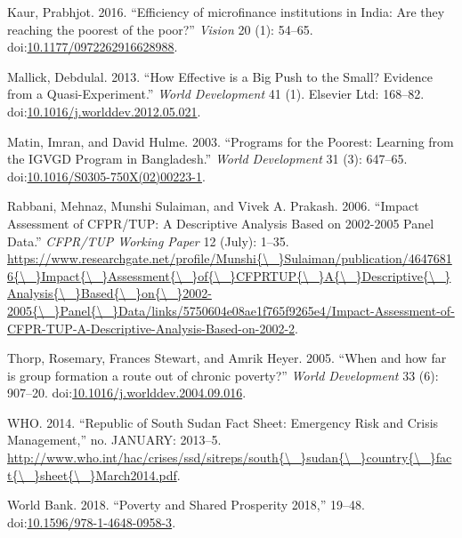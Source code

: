 \documentclass[]{article}
\begin{document}
\hypertarget{ref-Kaur2016}{}
Kaur, Prabhjot. 2016. ``Efficiency of microfinance institutions in
India: Are they reaching the poorest of the poor?'' \emph{Vision} 20
(1): 54--65.
doi:\href{https://doi.org/10.1177/0972262916628988}{10.1177/0972262916628988}.

\hypertarget{ref-Mallick2013}{}
Mallick, Debdulal. 2013. ``How Effective is a Big Push to the Small?
Evidence from a Quasi-Experiment.'' \emph{World Development} 41 (1).
Elsevier Ltd: 168--82.
doi:\href{https://doi.org/10.1016/j.worlddev.2012.05.021}{10.1016/j.worlddev.2012.05.021}.

\hypertarget{ref-Matin2003}{}
Matin, Imran, and David Hulme. 2003. ``Programs for the Poorest:
Learning from the IGVGD Program in Bangladesh.'' \emph{World
Development} 31 (3): 647--65.
doi:\href{https://doi.org/10.1016/S0305-750X(02)00223-1}{10.1016/S0305-750X(02)00223-1}.

\hypertarget{ref-Rabbani2006}{}
Rabbani, Mehnaz, Munshi Sulaiman, and Vivek A. Prakash. 2006. ``Impact
Assessment of CFPR/TUP: A Descriptive Analysis Based on 2002-2005 Panel
Data.'' \emph{CFPR/TUP Working Paper} 12 (July): 1--35.
\href{https://www.researchgate.net/profile/Munshi\%7B/_\%7DSulaiman/publication/46476816\%7B/_\%7DImpact\%7B/_\%7DAssessment\%7B/_\%7Dof\%7B/_\%7DCFPRTUP\%7B/_\%7DA\%7B/_\%7DDescriptive\%7B/_\%7DAnalysis\%7B/_\%7DBased\%7B/_\%7Don\%7B/_\%7D2002-2005\%7B/_\%7DPanel\%7B/_\%7DData/links/5750604e08ae1f765f9265e4/Impact-Assessment-of-CFPR-TUP-A-Descriptive-Analysis-Based-on-2002-2}{https://www.researchgate.net/profile/Munshi\{\textbackslash{}\_\}Sulaiman/publication/46476816\{\textbackslash{}\_\}Impact\{\textbackslash{}\_\}Assessment\{\textbackslash{}\_\}of\{\textbackslash{}\_\}CFPRTUP\{\textbackslash{}\_\}A\{\textbackslash{}\_\}Descriptive\{\textbackslash{}\_\}Analysis\{\textbackslash{}\_\}Based\{\textbackslash{}\_\}on\{\textbackslash{}\_\}2002-2005\{\textbackslash{}\_\}Panel\{\textbackslash{}\_\}Data/links/5750604e08ae1f765f9265e4/Impact-Assessment-of-CFPR-TUP-A-Descriptive-Analysis-Based-on-2002-2}.

\hypertarget{ref-Thorp2005}{}
Thorp, Rosemary, Frances Stewart, and Amrik Heyer. 2005. ``When and how
far is group formation a route out of chronic poverty?'' \emph{World
Development} 33 (6): 907--20.
doi:\href{https://doi.org/10.1016/j.worlddev.2004.09.016}{10.1016/j.worlddev.2004.09.016}.

\hypertarget{ref-WHO2014}{}
WHO. 2014. ``Republic of South Sudan Fact Sheet: Emergency Risk and
Crisis Management,'' no. JANUARY: 2013--5.
\href{http://www.who.int/hac/crises/ssd/sitreps/south\%7B/_\%7Dsudan\%7B/_\%7Dcountry\%7B/_\%7Dfact\%7B/_\%7Dsheet\%7B/_\%7DMarch2014.pdf}{http://www.who.int/hac/crises/ssd/sitreps/south\{\textbackslash{}\_\}sudan\{\textbackslash{}\_\}country\{\textbackslash{}\_\}fact\{\textbackslash{}\_\}sheet\{\textbackslash{}\_\}March2014.pdf}.

\hypertarget{ref-WorldBank2018}{}
World Bank. 2018. ``Poverty and Shared Prosperity 2018,'' 19--48.
doi:\href{https://doi.org/10.1596/978-1-4648-0958-3}{10.1596/978-1-4648-0958-3}.
\end{document}
